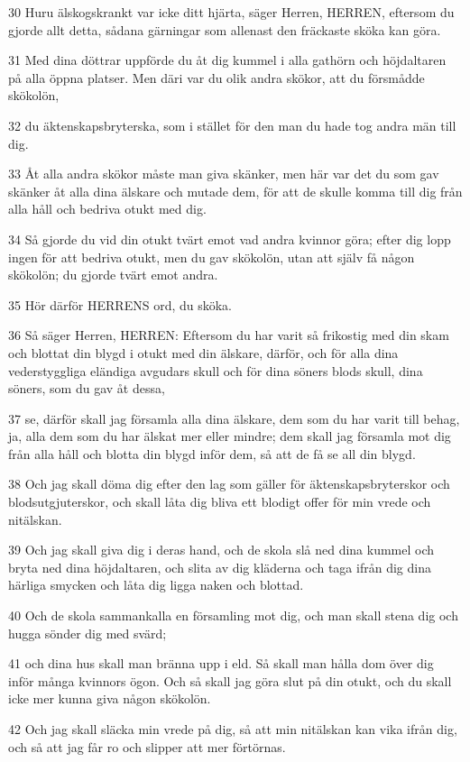 \par 30 Huru älskogskrankt var icke ditt hjärta, säger Herren, HERREN, eftersom du gjorde allt detta, sådana gärningar som allenast den fräckaste sköka kan göra.
\par 31 Med dina döttrar uppförde du åt dig kummel i alla gathörn och höjdaltaren på alla öppna platser. Men däri var du olik andra skökor, att du försmådde skökolön,
\par 32 du äktenskapsbryterska, som i stället för den man du hade tog andra män till dig.
\par 33 Åt alla andra skökor måste man giva skänker, men här var det du som gav skänker åt alla dina älskare och mutade dem, för att de skulle komma till dig från alla håll och bedriva otukt med dig.
\par 34 Så gjorde du vid din otukt tvärt emot vad andra kvinnor göra; efter dig lopp ingen för att bedriva otukt, men du gav skökolön, utan att själv få någon skökolön; du gjorde tvärt emot andra.
\par 35 Hör därför HERRENS ord, du sköka.
\par 36 Så säger Herren, HERREN: Eftersom du har varit så frikostig med din skam och blottat din blygd i otukt med din älskare, därför, och för alla dina vederstyggliga eländiga avgudars skull och för dina söners blods skull, dina söners, som du gav åt dessa,
\par 37 se, därför skall jag församla alla dina älskare, dem som du har varit till behag, ja, alla dem som du har älskat mer eller mindre; dem skall jag församla mot dig från alla håll och blotta din blygd inför dem, så att de få se all din blygd.
\par 38 Och jag skall döma dig efter den lag som gäller för äktenskapsbryterskor och blodsutgjuterskor, och skall låta dig bliva ett blodigt offer för min vrede och nitälskan.
\par 39 Och jag skall giva dig i deras hand, och de skola slå ned dina kummel och bryta ned dina höjdaltaren, och slita av dig kläderna och taga ifrån dig dina härliga smycken och låta dig ligga naken och blottad.
\par 40 Och de skola sammankalla en församling mot dig, och man skall stena dig och hugga sönder dig med svärd;
\par 41 och dina hus skall man bränna upp i eld. Så skall man hålla dom över dig inför många kvinnors ögon. Och så skall jag göra slut på din otukt, och du skall icke mer kunna giva någon skökolön.
\par 42 Och jag skall släcka min vrede på dig, så att min nitälskan kan vika ifrån dig, och så att jag får ro och slipper att mer förtörnas.
